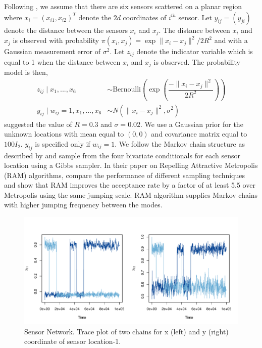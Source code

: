 \documentclass[11pt]{article}
\theoremstyle{remark}
\begin{document}
Following \cite{tak2018repelling}, we assume that there are six sensors scattered on a planar region where $x_i = (x_{i1}, x_{i2})^T$ denote the $2d$ coordinates of $i^{th}$ sensor. Let $y_{ij} = (y_{ji})$ denote the distance between the sensors $x_i$ and $x_j$. The distance between $x_i$ and $x_j$ is observed with probability $\pi (x_i, x_j) = \exp{\|x_i - x_j\|^2 / 2R^2}$ and with a Gaussian measurement error of $\sigma^2$. Let $z_{ij}$ denote the indicator variable which is equal to 1 when the distance between $x_i$ and $x_j$ is observed. The probability model is then,
%
\begin{align*}
    z_{ij} \mid x_1, ..., x_6 & \sim \text{Bernoulli}\left(\exp\left(\dfrac{-\|x_i - x_j\|^2}{2R^2}\right)\right)\\
    y_{ij} \mid w_{ij} = 1, x_1, ..., x_6 &\sim N(\|x_i - x_j\|^2, \sigma^2)
\end{align*}
%
\cite{ahn2013distributed} suggested the value of $R = 0.3$ and $\sigma = 0.02$. We use a Gaussian prior for the unknown locations with  mean equal to $(0,0)$ and covariance matrix equal to $100 I_2$. $y_{ij}$ is specified only if $w_{ij} = 1$. We follow the Markov chain structure as described by \cite{tak2018repelling} and sample from the four bivariate conditionals for each sensor location using a Gibbs sampler. In their paper on Repelling Attractive Metropolis (RAM) algorithms, \cite{tak2018repelling} compare the performance of different sampling techniques and show that RAM improves the acceptance rate by a factor of at least 5.5 over Metropolis using the same jumping scale. RAM algorithm supplies Markov chains with higher jumping frequency between the modes.

\begin{figure}[h]
    \centering
    \includegraphics[width = .9\textwidth]{sensor-trace_loc1.pdf}
    \caption{Sensor Network. Trace plot of two chains for x (left) and y (right) coordinate of sensor location-1.}
    \label{fig:sensor-trace}
\end{figure}
\end{document}
